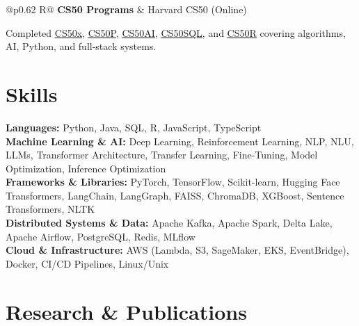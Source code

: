 \documentclass[a4paper,10pt]{article}
\newcommand{\ulink}[2]{\href{#1}{\uline{#2}}}
\newcommand{\subheading}[1]{{\color[HTML]{0A0A0A}\fontsize{12}{14}\selectfont\bfseries #1}}
\newcommand{\meta}[1]{{\color[HTML]{5C5C5C}\fontsize{10.5}{12.5}\selectfont #1}}
\begin{document}
\begin{tabularx}{\linewidth}{@{}p{0.62\linewidth} R@{}}
\subheading{CS50 Programs} & \meta{Harvard CS50 (Online)}
\end{tabularx}
\vspace{1pt}
{\color[HTML]{3A3A3A}\fontsize{11}{14}\selectfont Completed \ulink{https://cs50.harvard.edu/certificates/b14b78df-e05c-413e-a607-1dd27303053a}{CS50x}, \ulink{https://cs50.harvard.edu/certificates/32477052-9db4-49c4-a5a4-d7e58429ca2c}{CS50P}, \ulink{https://cs50.harvard.edu/certificates/9cdb4d4a-1250-4f8e-9fd7-191864e0f919}{CS50AI}, \ulink{https://cs50.harvard.edu/certificates/bc486f24-f085-4e61-8536-80940b97a1b9}{CS50SQL}, and \ulink{https://cs50.harvard.edu/certificates/666838e6-a053-4d82-b179-a60fe745fd84}{CS50R} covering algorithms, AI, Python, and full-stack systems.}

\vspace{2pt}

\section{Skills}
\vspace{5pt}
{\color[HTML]{0A0A0A}\fontsize{11}{14}\selectfont
\textbf{Languages:} Python, Java, SQL, R, JavaScript, TypeScript \\[2pt]
\textbf{Machine Learning \& AI:} Deep Learning, Reinforcement Learning, NLP, NLU, LLMs, Transformer Architecture, Transfer Learning, Fine-Tuning, Model Optimization, Inference Optimization \\[2pt]
\textbf{Frameworks \& Libraries:} PyTorch, TensorFlow, Scikit-learn, Hugging Face Transformers, LangChain, LangGraph, FAISS, ChromaDB, XGBoost, Sentence Transformers, NLTK \\[2pt]
\textbf{Distributed Systems \& Data:} Apache Kafka, Apache Spark, Delta Lake, Apache Airflow, PostgreSQL, Redis, MLflow \\[2pt]
\textbf{Cloud \& Infrastructure:} AWS (Lambda, S3, SageMaker, EKS, EventBridge), Docker, CI/CD Pipelines, Linux/Unix}

\vspace{2pt}

\section{Research \& Publications}
\vspace{2pt}
\end{document}
